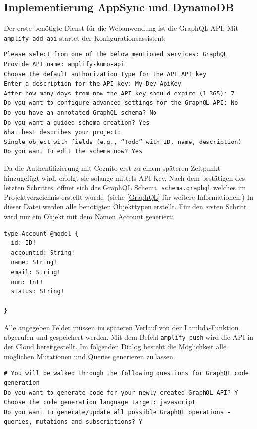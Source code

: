 \subsection{Implementierung AppSync und DynamoDB}
Der erste benötigte Dienst für die Webanwendung ist die GraphQL API.
Mit \verb+amplify add api+ startet der Konfigurationsassistent:

\begin{verbatim}
Please select from one of the below mentioned services: GraphQL
Provide API name: amplify-kumo-api
Choose the default authorization type for the API API key
Enter a description for the API key: My-Dev-ApiKey
After how many days from now the API key should expire (1-365): 7
Do you want to configure advanced settings for the GraphQL API: No
Do you have an annotated GraphQL schema? No
Do you want a guided schema creation? Yes
What best describes your project:
Single object with fields (e.g., “Todo” with ID, name, description)
Do you want to edit the schema now? Yes

\end{verbatim}

Da die Authentifizierung mit Cognito erst zu einem späteren Zeitpunkt hinzugefügt wird, erfolgt sie solange mittels API Key.
Nach dem bestätigen des letzten Schrittes, öffnet sich das GraphQL Schema, \verb+schema.graphql+ welches im Projektverzeichnis erstellt wurde. (siehe \ref{GraphQL}  für weitere Informationen.)
In dieser Datei werden alle benötigten Objekttypen erstellt.
Für den ersten Schritt wird nur ein Objekt mit dem Namen Account generiert:

\begin{verbatim}
type Account @model {
  id: ID!
  accountid: String!
  name: String!
  email: String!
  num: Int!
  status: String!

}

\end{verbatim}

Alle angegeben Felder müssen im späteren Verlauf von der Lambda-Funktion abgerufen und gespeichert werden.
Mit dem Befehl \verb+amplify push+ wird die API in der Cloud bereitgestellt.
Im folgenden Dialog besteht die Möglichkeit alle möglichen Mutationen und Queries generieren zu lassen.
\begin{verbatim}
# You will be walked through the following questions for GraphQL code generation
Do you want to generate code for your newly created GraphQL API? Y
Choose the code generation language target: javascript
Do you want to generate/update all possible GraphQL operations - queries, mutations and subscriptions? Y
\end{verbatim}

